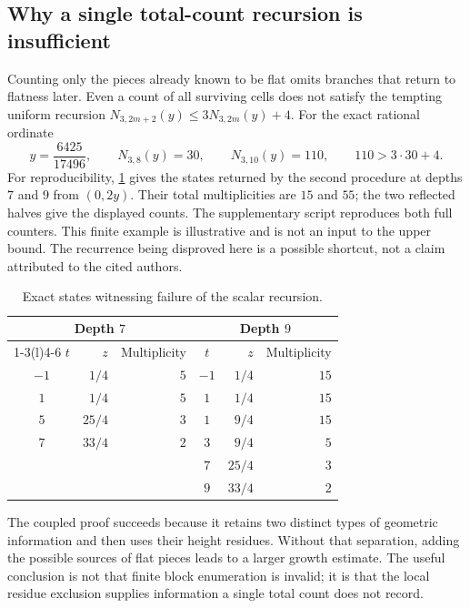 \documentclass[11pt]{article}
\theoremstyle{definition}
\theoremstyle{remark}
\begin{document}
\subsection{Why a single total-count recursion is insufficient}
Counting only the pieces already known to be flat omits branches that
return to flatness later. Even a count of all surviving cells does not
satisfy the tempting uniform recursion
$N_{3,2m+2}(y)\le3N_{3,2m}(y)+4$.
For the exact rational ordinate
\begin{equation}\label{eq:counterexample}
 y=\frac{6425}{17496},\qquad N_{3,8}(y)=30,\qquad N_{3,10}(y)=110,
 \qquad110>3\cdot30+4.
\end{equation}
For reproducibility, \cref{tab:counterstates} gives the states returned by
the second procedure at depths $7$ and $9$ from $(0,2y)$. Their total
multiplicities are $15$ and $55$; the two reflected halves give the
displayed counts. The supplementary script reproduces both full counters.
This finite example is illustrative and is not an input to the upper
bound. The recurrence being disproved here is a possible shortcut, not
a claim attributed to the cited authors.
\begin{table}[tb]
\centering
\begin{tabular}{@{}crrcrr@{}}
\toprule
\multicolumn{3}{c}{Depth $7$}&\multicolumn{3}{c}{Depth $9$}\\
\cmidrule(r){1-3}\cmidrule(l){4-6}
$t$ & $z$ & Multiplicity & $t$ & $z$ & Multiplicity\\
\midrule
$-1$ & $1/4$ & $5$ & $-1$ & $1/4$ & $15$\\
$1$ & $1/4$ & $5$ & $1$ & $1/4$ & $15$\\
$5$ & $25/4$ & $3$ & $1$ & $9/4$ & $15$\\
$7$ & $33/4$ & $2$ & $3$ & $9/4$ & $5$\\
 & & & $7$ & $25/4$ & $3$\\
 & & & $9$ & $33/4$ & $2$\\
\bottomrule
\end{tabular}
\caption{Exact states witnessing failure of the scalar recursion.}
\label{tab:counterstates}
\end{table}

The coupled proof succeeds because it retains two distinct types of
geometric information and then uses their height residues. Without that
separation, adding the possible sources of flat pieces leads to a larger
growth estimate. The useful conclusion is not that finite block
enumeration is invalid; it is that the local residue exclusion supplies
information a single total count does not record.
\end{document}
